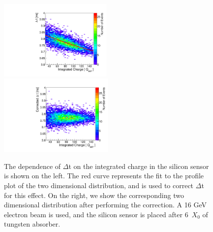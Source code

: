 \begin{figure}[htbp] 
\centering
\includegraphics[width=0.49\textwidth]{plots/DeltaT_vs_Charge_Uncorrected.pdf} 
\includegraphics[width=0.5\textwidth]{plots/DeltaT_vs_Charge_Corrected.pdf} 
\caption{ The dependence of $\Delta$t on the integrated charge in the 
silicon sensor is shown on the left. The red curve represents the fit to the
profile plot of the two dimensional distribution, and is used to correct
$\Delta$t for this effect. On the right, we show the corresponding two dimensional
distribution after performing the correction. A 16 GeV electron beam is used, and the silicon sensor is placed
after 6~$X_0$ of tungsten absorber.
} 
\label{fig:timewalk} 
\end{figure} 

